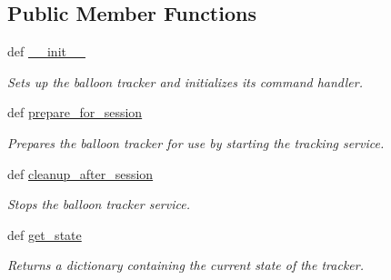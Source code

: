 \subsection*{Public Member Functions}
\begin{DoxyCompactItemize}
\item 
def \hyperlink{classhwm_1_1hardware_1_1devices_1_1drivers_1_1mxl__balloon__tracker_1_1mxl__balloon__tracker_1_1_m_x_l___balloon___tracker_acd53e746086866a84e4b573402468863}{\-\_\-\-\_\-init\-\_\-\-\_\-}
\begin{DoxyCompactList}\small\item\em Sets up the balloon tracker and initializes its command handler. \end{DoxyCompactList}\item 
def \hyperlink{classhwm_1_1hardware_1_1devices_1_1drivers_1_1mxl__balloon__tracker_1_1mxl__balloon__tracker_1_1_m_x_l___balloon___tracker_a7c46d8310a1b28fd0c54c9827bdb3c69}{prepare\-\_\-for\-\_\-session}
\begin{DoxyCompactList}\small\item\em Prepares the balloon tracker for use by starting the tracking service. \end{DoxyCompactList}\item 
\hypertarget{classhwm_1_1hardware_1_1devices_1_1drivers_1_1mxl__balloon__tracker_1_1mxl__balloon__tracker_1_1_m_x_l___balloon___tracker_ae22451be46328dd83d235d62afb58c00}{def \hyperlink{classhwm_1_1hardware_1_1devices_1_1drivers_1_1mxl__balloon__tracker_1_1mxl__balloon__tracker_1_1_m_x_l___balloon___tracker_ae22451be46328dd83d235d62afb58c00}{cleanup\-\_\-after\-\_\-session}}\label{classhwm_1_1hardware_1_1devices_1_1drivers_1_1mxl__balloon__tracker_1_1mxl__balloon__tracker_1_1_m_x_l___balloon___tracker_ae22451be46328dd83d235d62afb58c00}

\begin{DoxyCompactList}\small\item\em Stops the balloon tracker service. \end{DoxyCompactList}\item 
\hypertarget{classhwm_1_1hardware_1_1devices_1_1drivers_1_1mxl__balloon__tracker_1_1mxl__balloon__tracker_1_1_m_x_l___balloon___tracker_a83ce35d450e1f342be37e23d574c9beb}{def \hyperlink{classhwm_1_1hardware_1_1devices_1_1drivers_1_1mxl__balloon__tracker_1_1mxl__balloon__tracker_1_1_m_x_l___balloon___tracker_a83ce35d450e1f342be37e23d574c9beb}{get\-\_\-state}}\label{classhwm_1_1hardware_1_1devices_1_1drivers_1_1mxl__balloon__tracker_1_1mxl__balloon__tracker_1_1_m_x_l___balloon___tracker_a83ce35d450e1f342be37e23d574c9beb}

\begin{DoxyCompactList}\small\item\em Returns a dictionary containing the current state of the tracker. \end{DoxyCompactList}\end{DoxyCompactItemize}
